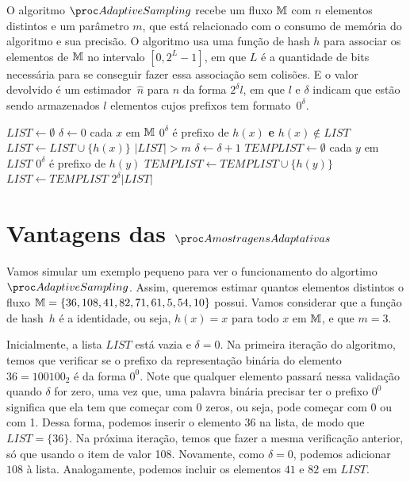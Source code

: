 O algoritmo $\AS$ recebe um fluxo $\mathbb{M}$ com $n$ elementos distintos e um parâmetro $m$, que está relacionado com o 
consumo de memória do algoritmo e sua precisão. O algoritmo usa uma função de hash $h$ para associar os elementos de 
$\mathbb{M}$ no intervalo $[0, 2^L - 1]$, em que $L$ é a quantidade de bits necessária para se conseguir fazer essa associação 
sem colisões. E o valor devolvido é um estimador~$\hat{n}$ para $n$ da forma $2^{\delta} l$, em que $l$ e $\delta$ 
indicam que estão sendo armazenados $l$ elementos cujos prefixos tem formato~$0^{\delta}$. 

\begin{codebox}
  \li $LIST \gets \emptyset$
  \li $\delta \gets 0$
  \li \For cada $x$ em $\mathbb{M}$ 
  \li    \Do 
         \If $0^{\delta}$ é prefixo de $h(x)$ \textbf{e} $h(x) \not\in LIST$
  \li             \Then $LIST \gets LIST \cup \{ h(x) \}$
         \End
  \li    \While $|LIST| > m$                                   \label{li:as:while}
  \li    \Do
         $\delta \gets \delta + 1$
  \li    $TEMPLIST \gets \emptyset$
  \li    \For cada $y$ em $LIST$
  \li    \Do
            \If $0^{\delta}$ é prefixo de $h(y)$
  \li       \Then $TEMPLIST \gets TEMPLIST \cup \{ h(y) \}$
            \End
         \End
  \li    $LIST \gets TEMPLIST$
         \End 
      \End
  \li
  \Return $2^{\delta} |LIST|$   
  \End
\end{codebox}


\section{Vantagens das $\asampling$}
\label{lab:chapter:04:02}

Vamos simular um exemplo pequeno para ver o funcionamento do algortimo $\AS$. Assim, queremos estimar quantos elementos 
distintos o fluxo $\mathbb{M} = \{ 36, 108, 41, 82, 71, 61, 5, 54, 10 \}$ possui. Vamos considerar que a função de hash~$h$ é
a identidade, ou seja, $h(x) = x$ para todo $x$ em $\mathbb{M}$, e que $m = 3$. 

Inicialmente, a lista $LIST$ está vazia e $\delta = 0$. Na primeira iteração do algoritmo, temos que verificar se o 
prefixo da representação binária do elemento $36 = 100100_2$ é da forma $0^0$. Note que qualquer elemento passará nessa 
validação quando $\delta$ for zero, uma vez que, uma palavra binária precisar ter o prefixo $0^0$ significa que ela tem 
que começar com 0 zeros, ou seja, pode começar com 0 ou com 1. Dessa forma, podemos inserir o elemento $36$ na lista, de 
modo que $LIST = \{ 36 \}$. Na próxima iteração, temos que fazer a mesma verificação anterior, só que usando o item de 
valor 108. Novamente, como $\delta = 0$, podemos adicionar $108$ à lista. Analogamente, podemos incluir os elementos 
$41$ e $82$ em $LIST$. 

